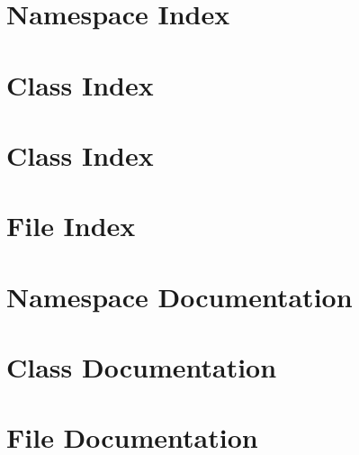 \documentclass{book}
\begin{document}
\chapter{Namespace Index}

\chapter{Class Index}

\chapter{Class Index}

\chapter{File Index}

\chapter{Namespace Documentation}



\chapter{Class Documentation}


















\chapter{File Documentation}




























\printindex
\end{document}
